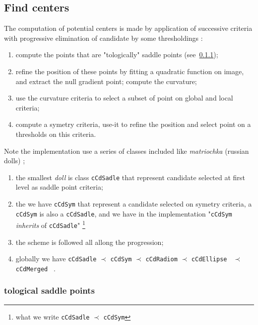
\subsection{Find centers}

The computation of potential centers is made by application of successive criteria with
progressive elimination of candidate  by some thresholdings :


\begin{enumerate}
     \item  compute the points that are "tologically" saddle points (see~\ref{TopoSadlePoint});

     \item  refine the position of these points by fitting a quadratic function  on image,
	     and extract the null gradient point;
             compute the curvature;

     \item  use the curvature criteria to select a subset of point on global and local criteria;

     \item  compute a symetry criteria, use-it to refine the position and select point on a thresholds on
	    this criteria.
\end{enumerate}

Note the implementation use a series of classes included like \emph{matriochka} (russian dolls) ;


\begin{enumerate}

	\item the smallest \emph{doll} is class  {\tt cCdSadle} that represent candidate selected 
		at first level as saddle point criteria;

	\item the we have {\tt cCdSym} that represent a candidate selected on symetry criteria, 
              a {\tt cCdSym} is also a {\tt cCdSadle},
		and we have in the implementation
		"{\tt cCdSym}  \emph{inherits} of {\tt cCdSadle}"
		\footnote{what we write  {\tt cCdSadle} $\prec$ {\tt cCdSym} }

        \item the scheme is followed all allong the progression;

	\item globally we have    {\tt cCdSadle} $\prec$ {\tt cCdSym}  $\prec$ {\tt cCdRadiom} 
		$\prec$ {\tt cCdEllipse } $\prec$ {\tt cCdMerged } .



\end{enumerate}


\subsubsection{tological saddle points}
\label{TopoSadlePoint}




